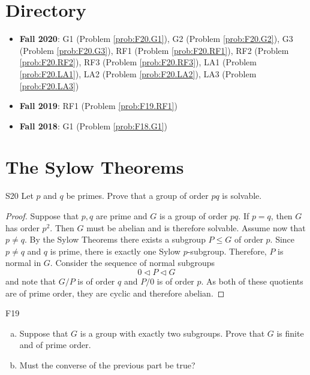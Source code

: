 \documentclass{article}
\newcommand{\normal}{\triangleleft}
\theoremstyle{definition}
\begin{document}
\section{Directory}

\begin{itemize}
\item \textbf{Fall 2020}:  	G1 (Problem \ref{prob:F20.G1}), 
							G2 (Problem \ref{prob:F20.G2}), 
							G3 (Problem \ref{prob:F20.G3}),
							RF1 (Problem \ref{prob:F20.RF1}),
							RF2 (Problem \ref{prob:F20.RF2}),
							RF3 (Problem \ref{prob:F20.RF3}),
							LA1 (Problem \ref{prob:F20.LA1}),
							LA2 (Problem \ref{prob:F20.LA2}),
							LA3 (Problem \ref{prob:F20.LA3})
\item \textbf{Fall 2019}: RF1 (Problem \ref{prob:F19.RF1})
\item \textbf{Fall 2018}: G1 (Problem \ref{prob:F18.G1})
\end{itemize}

\section{The Sylow Theorems}

	\begin{prob}{S20}{}
	Let $p$ and $q$ be primes. Prove that a group of order $pq$ is solvable.
	\end{prob}
	
	\begin{proof}
	Suppose that $p,q$ are prime and $G$ is a group of order $pq$. If $p = q$, then $G$ has order $p^2$. Then $G$ must be abelian and is therefore solvable. Assume now that $p \neq q$. By the Sylow Theorems there exists a subgroup $P \leq G$ of order $p$. Since $p \neq q$ and $q$ is prime, there is exactly one Sylow $p$-subgroup. Therefore, $P$ is normal in $G$. Consider the sequence of normal subgroups
		\[0 \normal P \normal G \]
	and note that $G/P$ is of order $q$ and $P/0$ is of order $p$. As both of these quotients are of prime order, they are cyclic and therefore abelian. 
	\end{proof}
	
	\begin{prob}{F19}{}
	\begin{enumerate}[(a)]
	\item Suppose that $G$ is a group with exactly two subgroups. Prove that $G$ is finite and of prime order.
	\item Must the converse of the previous part be true?
	\end{enumerate}
	\end{prob}
	
\end{document}
